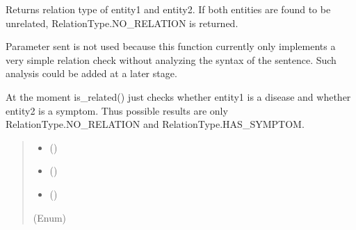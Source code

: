 \documentclass[letterpaper,10pt,english]{sphinxmanual}
\begin{document}
\begin{fulllineitems}
\begin{fulllineitems}
\end{fulllineitems}


\begin{fulllineitems}
\label{\detokenize{medextractor.knowledge:medextractor.knowledge.knowledge_extractor.KnowledgeExtractor.is_related}}
\pysigstartsignatures
{}
\pysigstopsignatures
\sphinxAtStartPar
Returns relation type of entity1 and entity2. If both entities are
found to be unrelated, RelationType.NO\_RELATION is returned.

\sphinxAtStartPar
Parameter sent is not used because this function currently only implements a
very simple relation check without analyzing the syntax of the sentence. Such
analysis could be added at a later stage.

\sphinxAtStartPar
At the moment is\_related() just checks whether entity1 is a disease and whether
entity2 is a symptom. Thus possible results are only RelationType.NO\_RELATION
and RelationType.HAS\_SYMPTOM.
\begin{quote}\begin{description}
\begin{itemize}
\item {} 
\sphinxAtStartPar
{} () \textendash{} 

\item {} 
\sphinxAtStartPar
{} () \textendash{} 

\item {} 
\sphinxAtStartPar
{} () \textendash{} 

\end{itemize}

\sphinxAtStartPar
{\hyperref[\detokenize{medextractor.knowledge:medextractor.knowledge.relations.RelationType}]{}} (Enum)

\end{description}\end{quote}


\end{fulllineitems}
\end{fulllineitems}
\end{document}
